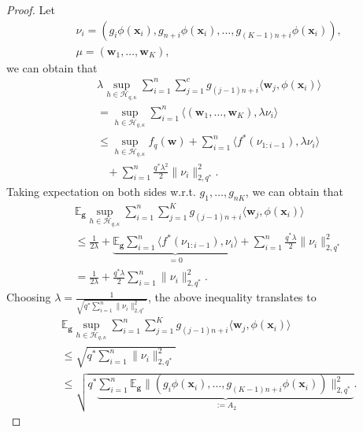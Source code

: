 \documentclass[10pt]{llncs}
\begin{document}
\begin{proof}
  Let
  \begin{align*}
    &\nu_i= (g_i\phi(\mathbf x_i),g_{n+i}\phi(\mathbf x_i),\ldots, g_{(K-1)n+i}\phi(\mathbf x_i)),\\
    &\mu=(\mathbf w_1,\ldots,\mathbf w_K),
  \end{align*}
  we can  obtain that
  \begin{align*}
    &\lambda\sup_{h\in \mathcal{H}_{q,\kappa}}\sum_{i=1}^n\sum_{j=1}^cg_{(j-1)n+i}\langle \mathbf w_j, \phi(\mathbf x_i)\rangle\\
    &=\sup_{h\in\mathcal{H}_{q,\kappa}}\sum_{i=1}^n\langle(\mathbf w_1,\ldots,\mathbf w_K),\lambda\nu_i\rangle\\
    &\leq \sup_{h\in\mathcal{H}_{q,\kappa}} f_q(\mathbf w)+\sum_{i=1}^n\langle f^\ast(\nu_{1:i-1}),\lambda\nu_i\rangle\\&~~~~+\sum_{i=1}^n\frac{q^\ast\lambda^2}{2}\|\nu_i\|_{2,q^\ast}^2.
  \end{align*}
  Taking expectation on both sides w.r.t. $g_1,\ldots,g_{nK}$,
  we can obtain that
  \begin{align*}
    &\mathbb{E}_{\bm g}\sup_{h\in\mathcal{H}_{q,\kappa}}\sum_{i=1}^n\sum_{j=1}^Kg_{(j-1)n+i}\langle \mathbf w_j, \phi(\mathbf x_i)\rangle\\
    \nonumber
    &\leq\frac{1}{2\lambda}+\underbrace{\mathbb{E}_{\bm g}\sum_{i=1}^n\langle f^\ast(\nu_{1:i-1}),\nu_i\rangle}_{=0}+
    \sum_{i=1}^n\frac{q^\ast\lambda}{2}\|\nu_i\|_{2,q^\ast}^2\\
    &=\frac{1}{2\lambda}+\frac{q^\ast\lambda}{2}\sum_{i=1}^n\|\nu_i\|_{2,q^\ast}^2.
  \end{align*}
  Choosing  $\lambda=\frac{1}{\sqrt{q^\ast\sum_{i=1}^n\|\nu_i\|_{2,q^\ast}^2}}$,
  the above inequality translates to
  \begin{align}
   \label{eq-mid-he}
  \nonumber
    &\mathbb{E}_{\bm g}\sup_{h\in\mathcal{H}_{q,\kappa}}\sum_{i=1}^n\sum_{j=1}^Kg_{(j-1)n+i}\langle \mathbf w_j, \phi(\mathbf x_i)\rangle\\
    \nonumber
    &\leq \sqrt{q^\ast\sum_{i=1}^n\|\nu_i\|_{2,q^\ast}^2}\\
    &\leq \sqrt{q^\ast\underbrace{\sum_{i=1}^n\mathbb{E}_{\bm g}\|(g_i\phi(\mathbf x_i),\ldots, g_{(K-1)n+i}\phi(\mathbf x_i))\|_{2,q^\ast}^2}_{:=A_2}}.
  \end{align}

\end{proof}
\end{document}
